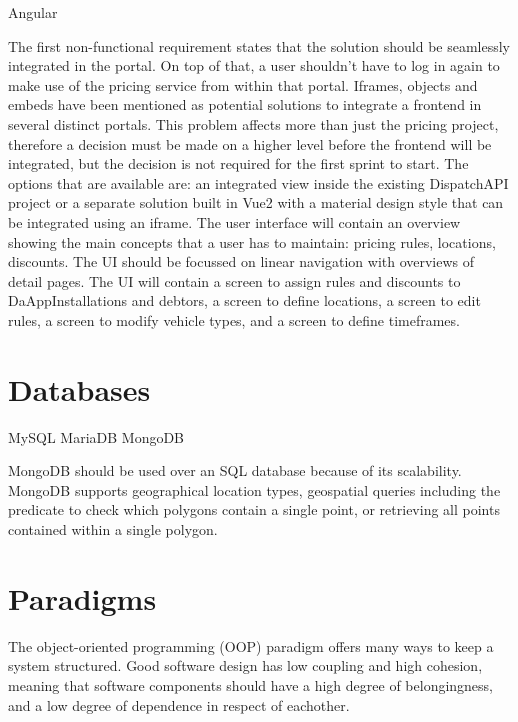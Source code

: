 Angular

The first non-functional requirement states that the solution should be seamlessly integrated in the portal. On top of that, a user shouldn’t have to log in again to make use of the pricing service from within that portal. Iframes, objects and embeds have been mentioned as potential solutions to integrate a frontend in several distinct portals. This problem affects more than just the pricing project, therefore a decision must be made on a higher level before the frontend will be integrated, but the decision is not required for the first sprint to start. The options that are available are: an integrated view inside the existing DispatchAPI project or a separate solution built in Vue2 with a material design style that can be integrated using an iframe. The user interface will contain an overview showing the main concepts that a user has to maintain: pricing rules, locations, discounts. The UI should be focussed on linear navigation with overviews of detail pages. The UI will contain a screen to assign rules and discounts to DaAppInstallations and debtors, a screen to define locations, a screen to edit rules, a screen to modify vehicle types, and a screen to define timeframes.

%
\section{Databases}
MySQL
MariaDB
MongoDB

MongoDB should be used over an SQL database because of its scalability. MongoDB supports geographical location types, geospatial queries including the predicate to check which polygons contain a single point, or retrieving all points contained within a single polygon.

%
\section{Paradigms}
The object-oriented programming (OOP) paradigm offers many ways to keep a system structured. Good software design has low coupling and high cohesion, meaning that software components should have a high degree of belongingness, and a low degree of dependence in respect of eachother.

